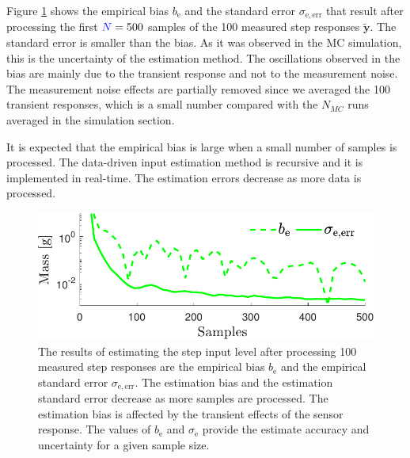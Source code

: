 Figure \ref{fig:b_sigma_exp_str} shows the empirical bias $b_{\mathrm{e}}$ and the standard error $\sigma_{\mathrm{e,err}}$ that result after processing the first $\color{blue}N\color{black}=500$ samples of the 100 measured step responses $\widetilde{\mathbf{y}}$.
The standard error is smaller than the bias.
As it was observed in the MC simulation, this is the uncertainty of the estimation method.
The oscillations observed in the bias are mainly due to the transient response and not to the measurement noise.
The measurement noise effects are partially removed since we averaged the 100 transient responses, 
which is a small number compared with the $N_{MC}$ runs averaged in the simulation section. 

It is expected that the empirical bias is large when a small number of samples is processed. 
The data-driven input estimation method is recursive and it is implemented in real-time.
The estimation errors decrease as more data is processed.

\begin{figure}[!htb]
\centering
\includegraphics[width=0.69\columnwidth]{./ChapterExperimentalValidation/fig/Fig_8.pdf} 
\caption{ \label{fig:b_sigma_exp_str} 
The results of estimating the step input level after processing 100 measured step responses are the empirical bias $b_{\mathrm{e}}$ and the empirical standard error $\sigma_{\mathrm{e,err}}$. 
The estimation bias and the estimation standard error decrease as more samples are processed. 
The estimation bias is affected by the transient effects of the sensor response.  
The values of $b_{\mathrm{e}}$ and $\sigma_{\mathrm{e}}$ provide the estimate accuracy and uncertainty for a given sample size.
}
\end{figure}

